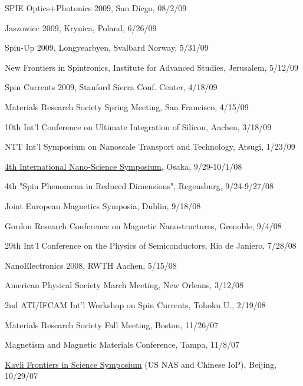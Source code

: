 \documentclass[paper=letter,fontsize=11pt]{scrartcl} %
\newcommand{\TalkEntry}[4]{
		\noindent #1, #2, #3 #4}
\begin{document}
\begin{etaremune}
\item\TalkEntry{SPIE Optics+Photonics 2009}{San Diego}{08/2/09}{}
\item\TalkEntry{Jaszowiec 2009}{Krynica, Poland}{6/26/09}{}
\item\TalkEntry{Spin-Up 2009}{Longyearbyen, Svalbard Norway}{5/31/09}{}
\item\TalkEntry{New Frontiers in Spintronics}{Institute for Advanced Studies, Jerusalem}{5/12/09}{}
\item\TalkEntry{Spin Currents 2009}{Stanford Sierra Conf. Center}{4/18/09}{}
\item\TalkEntry{Materials Research Society Spring Meeting}{San Francisco}{4/15/09}{}
\item\TalkEntry{10th Int’l Conference on Ultimate Integration of Silicon}{Aachen}{3/18/09}{}
\item\TalkEntry{NTT Int’l Symposium on Nanoscale Transport and Technology}{Atsugi}{1/23/09}{}
\item\TalkEntry{\href{http://www.sanken.osaka-u.ac.jp/for_TV/nanosympo2008/video/3-day/9_Appelbaum.asx}{4th International Nano-Science Symposium}}{Osaka}{9/29-10/1/08}{}
\item\TalkEntry{4th "Spin Phenomena in Reduced Dimensions"}{Regensburg}{9/24-9/27/08}{}
\item\TalkEntry{Joint European Magnetics Symposia}{Dublin}{9/18/08}{}
\item\TalkEntry{Gordon Research Conference on Magnetic Nanostructures}{Grenoble}{9/4/08}{}
\item\TalkEntry{29th Int’l Conference on the Physics of Semiconductors}{Rio de Janiero}{7/28/08}{}
\item\TalkEntry{NanoElectronics 2008}{RWTH Aachen}{5/15/08}{}
\item\TalkEntry{American Physical Society March Meeting}{New Orleans}{3/12/08}{}
\item\TalkEntry{2nd ATI/IFCAM Int’l Workshop on Spin Currents}{Tohoku U.}{2/19/08}{}
\item\TalkEntry{Materials Research Society Fall Meeting}{Boston}{11/26/07}{}
\item\TalkEntry{Magnetism and Magnetic Materials Conference}{Tampa}{11/8/07}{}
\item\TalkEntry{\href{http://vimeo.com/32338065}{Kavli Frontiers in Science Symposium} (US NAS and Chinese IoP)}{Beijing}{10/29/07}{}
\end{etaremune}
\end{document}
